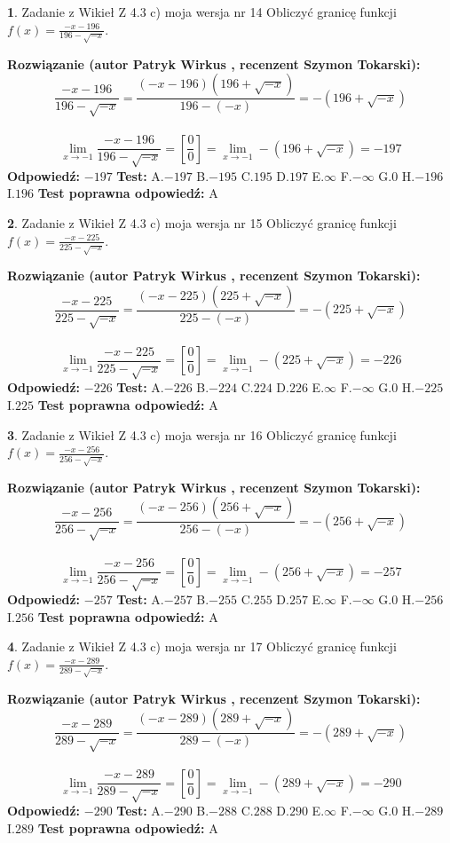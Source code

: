 \documentclass[12pt, a4paper]{article}
\theoremstyle{definition} %
\newtheorem{zad}{}
\newcommand{\zadStart}[1]{\begin{zad}#1\newline}
\newcommand{\zadStop}{\end{zad}}
\newcommand{\rozwStart}[2]{\noindent \textbf{Rozwiązanie (autor #1 , recenzent #2): }\newline}
\newcommand{\rozwStop}{\newline}
\newcommand{\odpStart}{\noindent \textbf{Odpowiedź:}\newline}
\newcommand{\odpStop}{\newline}
\newcommand{\testStart}{\noindent \textbf{Test:}\newline}
\newcommand{\testStop}{\newline}
\newcommand{\kluczStart}{\noindent \textbf{Test poprawna odpowiedź:}\newline}
\newcommand{\kluczStop}{\newline}
\begin{document}
\zadStart{Zadanie z Wikieł Z 4.3 c) moja wersja nr 14}
Obliczyć granicę funkcji $f(x)=\frac{-x-196}{196-\sqrt{-x}}$.
\zadStop
\rozwStart{Patryk Wirkus}{Szymon Tokarski}
$$\frac{-x-196}{196-\sqrt{-x}}=\frac{(-x-196)(196+\sqrt{-x})}{196-(-x)}=-(196+\sqrt{-x})$$
\\
$$\lim\limits_{x\to-1}\frac{-x-196}{196-\sqrt{-x}}=[\frac{0}{0}]=\lim\limits_{x\to-1}-(196+\sqrt{-x}) =-197$$
\rozwStop
\odpStart
$-197$
\odpStop
\testStart
A.$-197$
B.$-195$
C.$195$
D.$197$
E.$\infty$
F.$-\infty$
G.$0$
H.$-196$
I.$196$
\testStop
\kluczStart
A
\kluczStop



\zadStart{Zadanie z Wikieł Z 4.3 c) moja wersja nr 15}
Obliczyć granicę funkcji $f(x)=\frac{-x-225}{225-\sqrt{-x}}$.
\zadStop
\rozwStart{Patryk Wirkus}{Szymon Tokarski}
$$\frac{-x-225}{225-\sqrt{-x}}=\frac{(-x-225)(225+\sqrt{-x})}{225-(-x)}=-(225+\sqrt{-x})$$
\\
$$\lim\limits_{x\to-1}\frac{-x-225}{225-\sqrt{-x}}=[\frac{0}{0}]=\lim\limits_{x\to-1}-(225+\sqrt{-x}) =-226$$
\rozwStop
\odpStart
$-226$
\odpStop
\testStart
A.$-226$
B.$-224$
C.$224$
D.$226$
E.$\infty$
F.$-\infty$
G.$0$
H.$-225$
I.$225$
\testStop
\kluczStart
A
\kluczStop



\zadStart{Zadanie z Wikieł Z 4.3 c) moja wersja nr 16}
Obliczyć granicę funkcji $f(x)=\frac{-x-256}{256-\sqrt{-x}}$.
\zadStop
\rozwStart{Patryk Wirkus}{Szymon Tokarski}
$$\frac{-x-256}{256-\sqrt{-x}}=\frac{(-x-256)(256+\sqrt{-x})}{256-(-x)}=-(256+\sqrt{-x})$$
\\
$$\lim\limits_{x\to-1}\frac{-x-256}{256-\sqrt{-x}}=[\frac{0}{0}]=\lim\limits_{x\to-1}-(256+\sqrt{-x}) =-257$$
\rozwStop
\odpStart
$-257$
\odpStop
\testStart
A.$-257$
B.$-255$
C.$255$
D.$257$
E.$\infty$
F.$-\infty$
G.$0$
H.$-256$
I.$256$
\testStop
\kluczStart
A
\kluczStop



\zadStart{Zadanie z Wikieł Z 4.3 c) moja wersja nr 17}
Obliczyć granicę funkcji $f(x)=\frac{-x-289}{289-\sqrt{-x}}$.
\zadStop
\rozwStart{Patryk Wirkus}{Szymon Tokarski}
$$\frac{-x-289}{289-\sqrt{-x}}=\frac{(-x-289)(289+\sqrt{-x})}{289-(-x)}=-(289+\sqrt{-x})$$
\\
$$\lim\limits_{x\to-1}\frac{-x-289}{289-\sqrt{-x}}=[\frac{0}{0}]=\lim\limits_{x\to-1}-(289+\sqrt{-x}) =-290$$
\rozwStop
\odpStart
$-290$
\odpStop
\testStart
A.$-290$
B.$-288$
C.$288$
D.$290$
E.$\infty$
F.$-\infty$
G.$0$
H.$-289$
I.$289$
\testStop
\kluczStart
A
\kluczStop
\end{document}
